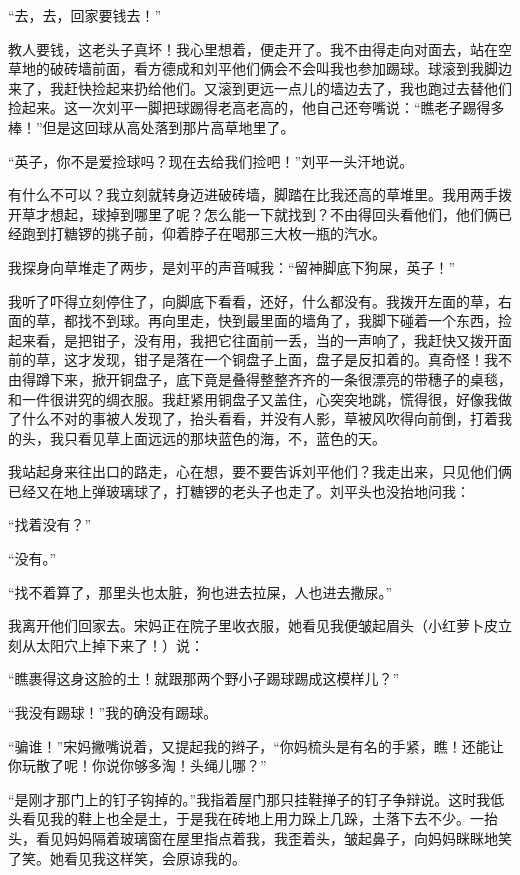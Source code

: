 \par “去，去，回家要钱去！”
\par 教人要钱，这老头子真坏！我心里想着，便走开了。我不由得走向对面去，站在空草地的破砖墙前面，看方德成和刘平他们俩会不会叫我也参加踢球。球滚到我脚边来了，我赶快捡起来扔给他们。又滚到更远一点儿的墙边去了，我也跑过去替他们捡起来。这一次刘平一脚把球踢得老高老高的，他自己还夸嘴说：“瞧老子踢得多棒！”但是这回球从高处落到那片高草地里了。
\par “英子，你不是爱捡球吗？现在去给我们捡吧！”刘平一头汗地说。
\par 有什么不可以？我立刻就转身迈进破砖墙，脚踏在比我还高的草堆里。我用两手拨开草才想起，球掉到哪里了呢？怎么能一下就找到？不由得回头看他们，他们俩已经跑到打糖锣的挑子前，仰着脖子在喝那三大枚一瓶的汽水。
\par 我探身向草堆走了两步，是刘平的声音喊我：“留神脚底下狗屎，英子！”
\par 我听了吓得立刻停住了，向脚底下看看，还好，什么都没有。我拨开左面的草，右面的草，都找不到球。再向里走，快到最里面的墙角了，我脚下碰着一个东西，捡起来看，是把钳子，没有用，我把它往面前一丢，当的一声响了，我赶快又拨开面前的草，这才发现，钳子是落在一个铜盘子上面，盘子是反扣着的。真奇怪！我不由得蹲下来，掀开铜盘子，底下竟是叠得整整齐齐的一条很漂亮的带穗子的桌毯，和一件很讲究的绸衣服。我赶紧用铜盘子又盖住，心突突地跳，慌得很，好像我做了什么不对的事被人发现了，抬头看看，并没有人影，草被风吹得向前倒，打着我的头，我只看见草上面远远的那块蓝色的海，不，蓝色的天。
\par 我站起身来往出口的路走，心在想，要不要告诉刘平他们？我走出来，只见他们俩已经又在地上弹玻璃球了，打糖锣的老头子也走了。刘平头也没抬地问我：
\par “找着没有？”
\par “没有。”
\par “找不着算了，那里头也太脏，狗也进去拉屎，人也进去撒尿。”
\par 我离开他们回家去。宋妈正在院子里收衣服，她看见我便皱起眉头（小红萝卜皮立刻从太阳穴上掉下来了！）说：
\par “瞧裹得这身这脸的土！就跟那两个野小子踢球踢成这模样儿？”
\par “我没有踢球！”我的确没有踢球。
\par “骗谁！”宋妈撇嘴说着，又提起我的辫子，“你妈梳头是有名的手紧，瞧！还能让你玩散了呢！你说你够多淘！头绳儿哪？”
\par “是刚才那门上的钉子钩掉的。”我指着屋门那只挂鞋掸子的钉子争辩说。这时我低头看见我的鞋上也全是土，于是我在砖地上用力跺上几跺，土落下去不少。一抬头，看见妈妈隔着玻璃窗在屋里指点着我，我歪着头，皱起鼻子，向妈妈眯眯地笑了笑。她看见我这样笑，会原谅我的。




